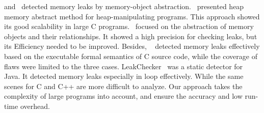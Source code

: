 \cite{DWC12} and~\cite{XR08} detected memory leaks by memory-object abstraction.~\cite{DWC12} presented heap memory abstract method for heap-manipulating programs. This approach showed its good scalability in large C programs.~\cite{XR08} focused on the abstraction of memory objects and their relationships. It showed a high precision for checking leaks, but its Efficiency needed to be improved. Besides, ~\cite{LXL15} detected memory leaks effectively based on the executable formal semantics of C source code, while the coverage of flaws were limited to the three cases. LeakChecker~\cite{YXYR14} was a static detector for Java. It detected memory leaks especially in loop effectively. While the same scenes for C and C++ are more difficult to analyze. Our approach takes the complexity of large programs into account, and ensure the accuracy and low run-time overhead.

